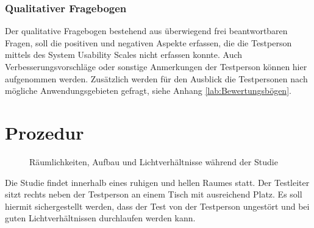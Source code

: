 \documentclass[a4paper,12pt,bibliography=totoc]{scrreprt}%
\begin{document}
\subsubsection{Qualitativer Fragebogen}
Der qualitative Fragebogen bestehend aus überwiegend frei beantwortbaren Fragen, soll die positiven und negativen Aspekte erfassen, die die Testperson mittels des System Usability Scales nicht erfassen konnte. Auch Verbesserungsvorschläge oder sonstige Anmerkungen der Testperson können hier aufgenommen werden. Zusätzlich werden für den Ausblick die Testpersonen nach mögliche Anwendungsgebieten gefragt, siehe Anhang \ref{lab:Bewertungsbögen}.

\section{Prozedur}
\begin{figure}
\centering
{}
\caption{Räumlichkeiten, Aufbau und Lichtverhältnisse während der Studie}
\label{klickschwebepositionen}
\end{figure}
Die Studie findet innerhalb eines ruhigen und hellen Raumes statt. Der Testleiter sitzt rechts neben der Testperson an einem Tisch mit ausreichend Platz. Es soll hiermit sichergestellt werden, dass der Test von der Testperson ungestört und bei guten Lichtverhältnissen durchlaufen werden kann.
\end{document}
